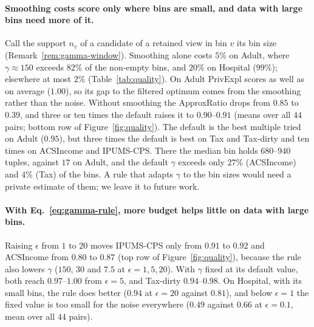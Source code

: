 \paragraph{Smoothing costs score only where bins are small, and data with large bins need more of it.}
Call the support $n_v$ of a candidate of a retained view in bin $v$ its bin size (Remark~\ref{rem:gamma-window}).
Smoothing alone costs \Bone{} $5\%$ on Adult, where $\gamma\approx150$ exceeds $82\%$ of the non-empty bins, and $20\%$ on Hospital ($99\%$); elsewhere at most $2\%$ (Table~\ref{tab:quality}).
On Adult \textsf{PrivExpl} scores as well as \Bone{} on average ($1.00$), so its gap to the filtered optimum comes from the smoothing rather than the noise.
Without smoothing the ApproxRatio drops from $0.85$ to $0.39$, and three or ten times the default raises it to $0.90$--$0.91$ (means over all $44$ pairs; bottom row of Figure~\ref{fig:quality}).
The default is the best multiple tried on Adult ($0.95$), but three times the default is best on Tax and Tax-dirty and ten times on ACSIncome and IPUMS-CPS.
There the median bin holds $680$--$940$ tuples, against $17$ on Adult, and the default $\gamma$ exceeds only $27\%$ (ACSIncome) and $4\%$ (Tax) of the bins.
A rule that adapts $\gamma$ to the bin sizes would need a private estimate of them; we leave it to future work.

\paragraph{With Eq.~\eqref{eq:gamma-rule}, more budget helps little on data with large bins.}
Raising $\epsilon$ from $1$ to $20$ moves IPUMS-CPS only from $0.91$ to $0.92$ and ACSIncome from $0.80$ to $0.87$ (top row of Figure~\ref{fig:quality}), because the rule also lowers $\gamma$ ($150$, $30$ and $7.5$ at $\epsilon=1,5,20$).
With $\gamma$ fixed at its default value, both reach $0.97$--$1.00$ from $\epsilon=5$, and Tax-dirty $0.94$--$0.98$.
On Hospital, with its small bins, the rule does better ($0.94$ at $\epsilon=20$ against $0.81$), and below $\epsilon=1$ the fixed value is too small for the noise everywhere ($0.49$ against $0.66$ at $\epsilon=0.1$, mean over all $44$ pairs).

